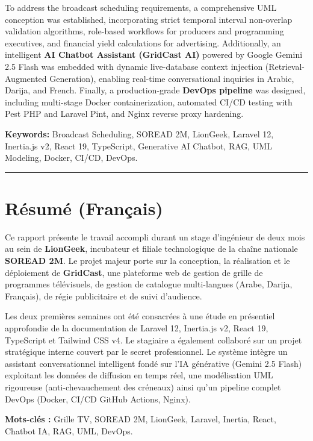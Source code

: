 \documentclass[12pt,a4paper,oneside]{report}
\begin{document}
To address the broadcast scheduling requirements, a comprehensive UML conception was established, incorporating strict temporal interval non-overlap validation algorithms, role-based workflows for producers and programming executives, and financial yield calculations for advertising. Additionally, an intelligent \textbf{AI Chatbot Assistant (GridCast AI)} powered by Google Gemini 2.5 Flash was embedded with dynamic live-database context injection (Retrieval-Augmented Generation), enabling real-time conversational inquiries in Arabic, Darija, and French. Finally, a production-grade \textbf{DevOps pipeline} was designed, including multi-stage Docker containerization, automated CI/CD testing with Pest PHP and Laravel Pint, and Nginx reverse proxy hardening.

\textbf{Keywords:} Broadcast Scheduling, SOREAD 2M, LionGeek, Laravel 12, Inertia.js v2, React 19, TypeScript, Generative AI Chatbot, RAG, UML Modeling, Docker, CI/CD, DevOps.

\vspace{0.8cm}
\hrule
\vspace{0.8cm}

\section*{Résumé (Français)}
Ce rapport présente le travail accompli durant un stage d'ingénieur de deux mois au sein de \textbf{LionGeek}, incubateur et filiale technologique de la chaîne nationale \textbf{SOREAD 2M}. Le projet majeur porte sur la conception, la réalisation et le déploiement de \textbf{GridCast}, une plateforme web de gestion de grille de programmes télévisuels, de gestion de catalogue multi-langues (Arabe, Darija, Français), de régie publicitaire et de suivi d'audience.

Les deux premières semaines ont été consacrées à une étude en présentiel approfondie de la documentation de Laravel 12, Inertia.js v2, React 19, TypeScript et Tailwind CSS v4. Le stagiaire a également collaboré sur un projet stratégique interne couvert par le secret professionnel. Le système intègre un assistant conversationnel intelligent fondé sur l'IA générative (Gemini 2.5 Flash) exploitant les données de diffusion en temps réel, une modélisation UML rigoureuse (anti-chevauchement des créneaux) ainsi qu'un pipeline complet DevOps (Docker, CI/CD GitHub Actions, Nginx).

\textbf{Mots-clés :} Grille TV, SOREAD 2M, LionGeek, Laravel, Inertia, React, Chatbot IA, RAG, UML, DevOps.
\end{document}
